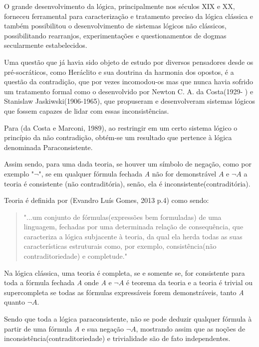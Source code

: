O grande desenvolvimento da lógica, principalmente nos séculos XIX e XX, forneceu ferramental para caracterização e tratamento preciso da lógica clássica e também possibilitou o desenvolvimento de sistemas lógicos não clássicos, possibilitando rearranjos, experimentações e questionamentos de dogmas secularmente estabelecidos.

Uma questão que já havia sido objeto de estudo por diversos pensadores desde os pré-socráticos, como Heráclito e sua doutrina da harmonia dos opostos, é a questão da contradição, que por vezes incomodou-os mas que nunca havia sofrido um tratamento formal como o desenvolvido por Newton C. A. da Costa(1929- ) e Stanislaw Jaskiwski(1906-1965), que propuseram e desenvolveram sistemas lógicos que fossem capazes de lidar com essas inconsistências. 

Para (da Costa e Marconi, 1989), ao restringir em um certo sistema lógico o princípio da não contradição, obtém-se um resultado que pertence à lógica denominada Paraconsistente.


Assim sendo, para uma dada teoria, se houver um símbolo de negação, como por exemplo "\emph{$\neg $}", se em qualquer fórmula fechada \emph{A} não for demonstrável \emph{$A$} e \emph{$\neg A $} a teoria é consistente (não contraditória), senão, ela é inconsistente(contraditória).


Teoria é definida por (Evandro Luís Gomes, 2013 p.4) como sendo:
\begin{quote}
"...um conjunto de fórmulas(expressões bem formuladas) de uma linguagem, fechadas por uma determinada relação de consequência, que caracteriza a lógica subjacente à teoria, da qual ela herda todas as suas características estruturais como, por exemplo, consistência(não contraditoriedade) e completude." 
\end{quote}

Na lógica clássica, uma teoria é completa, se e somente se, for consistente para toda a fórmula fechada \emph{A} onde \emph{A} e \emph{$\neg A$} é teorema da teoria e a teoria é trivial ou supercompleta se todas as fórmulas expressáveis forem demonstráveis, tanto \emph{A} quanto \emph{$ \neg A$}.


Sendo que toda a lógica paraconsistente, não se pode deduzir qualquer fórmula à partir de uma fórmula \emph{A} e sua negação \emph{$\neg A$}, mostrando assim que as noções de inconsistência(contraditoriedade) e trivialidade são de fato independentes.




